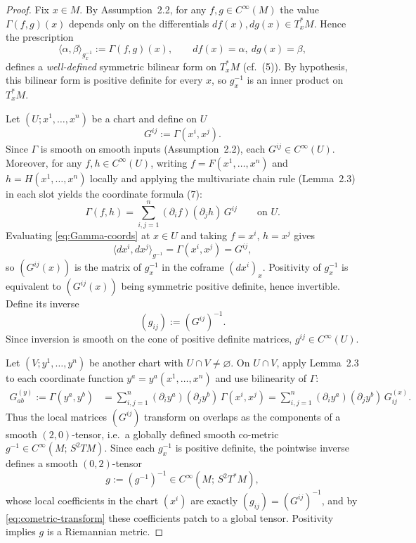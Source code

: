\documentclass[10pt,a4paper]{amsart}
\begin{document}
\begin{proof}
Fix $x\in M$. By Assumption~2.2, for any $f,g\in C^\infty(M)$ the value $\Gamma(f,g)(x)$ depends
only on the differentials $df(x),dg(x)\in T_x^*M$. Hence the prescription
\[
\langle \alpha,\beta\rangle_{g^{-1}_x}:=\Gamma(f,g)(x),
\qquad df(x)=\alpha,\ dg(x)=\beta,
\]
defines a \emph{well-defined} symmetric bilinear form on $T_x^*M$ (cf.\ (5)).
By hypothesis, this bilinear form is positive definite for every $x$, so $g^{-1}_x$ is an inner product
on $T_x^*M$.

Let $(U;x^1,\dots,x^n)$ be a chart and define on $U$
\[
G^{ij}:=\Gamma(x^i,x^j).
\]
Since $\Gamma$ is smooth on smooth inputs (Assumption~2.2), each $G^{ij}\in C^\infty(U)$.
Moreover, for any $f,h\in C^\infty(U)$, writing $f=F(x^1,\dots,x^n)$ and $h=H(x^1,\dots,x^n)$
locally and applying the multivariate chain rule (Lemma~2.3) in each slot yields the coordinate formula (7):
\begin{equation}\label{eq:Gamma-coords}
\Gamma(f,h)=\sum_{i,j=1}^n (\partial_i f)(\partial_j h)\,G^{ij}
\qquad\text{on }U.
\end{equation}
Evaluating \eqref{eq:Gamma-coords} at $x\in U$ and taking $f=x^i$, $h=x^j$ gives
\[
\langle dx^i,dx^j\rangle_{g^{-1}} = \Gamma(x^i,x^j)=G^{ij},
\]
so $(G^{ij}(x))$ is the matrix of $g^{-1}_x$ in the coframe $(dx^i)_x$. Positivity of $g^{-1}_x$
is equivalent to $(G^{ij}(x))$ being symmetric positive definite, hence invertible. Define its inverse
\[
(g_{ij}) := (G^{ij})^{-1}.
\]
Since inversion is smooth on the cone of positive definite matrices, $g^{ij}\in C^\infty(U)$.

Let $(V;y^1,\dots,y^n)$ be another chart with $U\cap V\neq\varnothing$. On $U\cap V$, apply
Lemma~2.3 to each coordinate function $y^a=y^a(x^1,\dots,x^n)$ and use bilinearity of $\Gamma$:
\begin{align}
G^{(y)}_{ab}
:=\Gamma(y^a,y^b)
&=\sum_{i,j=1}^n (\partial_i y^a)(\partial_j y^b)\,\Gamma(x^i,x^j)
=\sum_{i,j=1}^n (\partial_i y^a)(\partial_j y^b)\,G^{(x)}_{ij}.
\label{eq:cometric-transform}
\end{align}
Thus the local matrices $(G^{ij})$ transform on overlaps as the components of a smooth $(2,0)$-tensor,
i.e.\ a globally defined smooth co-metric $g^{-1}\in C^\infty(M;\,S^2TM)$. Since each $g^{-1}_x$ is
positive definite, the pointwise inverse defines a smooth $(0,2)$-tensor
\[
g := (g^{-1})^{-1}\in C^\infty(M;\,S^2T^*M),
\]
whose local coefficients in the chart $(x^i)$ are exactly $(g_{ij})=(G^{ij})^{-1}$, and by
\eqref{eq:cometric-transform} these coefficients patch to a global tensor. Positivity implies $g$ is a
Riemannian metric.


\end{proof}
\end{document}
